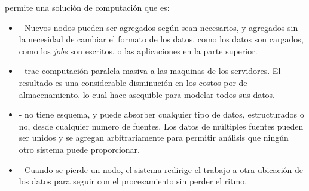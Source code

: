 \hadoopNAME permite una solución de computación que es:

\begin{itemize}
	\item \textbf{\scalableQA}- Nuevos nodos pueden ser agregados según sean necesarios, y agregados sin la necesidad de cambiar el formato de los datos, como los datos son cargados, como los \textit{jobs} son escritos, o las aplicaciones en la parte superior.
	
	\item \textbf{\costEffectiveCPT}- \hadoopNAME trae computación paralela masiva a las maquinas de los servidores. El resultado es una considerable disminución en los costos por \terabytePC de almacenamiento. lo cual hace asequible para modelar todos sus datos.
	
	\item \textbf{\flexibleQA}- \hadoopNAME no tiene esquema, y puede absorber cualquier tipo de datos, estructurados o no, desde cualquier numero de fuentes. Los datos de múltiples fuentes pueden ser unidos y se agregan arbitrariamente para permitir análisis que ningún otro sistema puede proporcionar.
	
	\item \textbf{\faultTolerantQA}- Cuando se pierde un nodo, el sistema redirige el trabajo a otra ubicación de los datos para seguir con el procesamiento sin perder el ritmo.
\end{itemize}